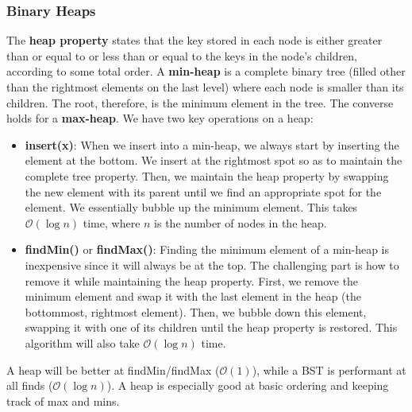 \documentclass{article}
\newcommand{\bigO}{\mathcal{O}}
\begin{document}
    \subsubsection{Binary Heaps}
    The \textbf{heap property} states that the key stored in each node is either greater than or equal to or less than or equal to the keys in the node's children, according to some total order. A \textbf{min-heap} is a complete binary tree (filled other than the rightmost elements on the last level) where each node is smaller than its children. The root, therefore, is the minimum element in the tree. The converse holds for a \textbf{max-heap}. We have two key operations on a heap: 
    
    \begin{itemize}
        \item \textbf{insert(x)}: When we insert into a min-heap, we always start by inserting the element at the bottom. We insert at the rightmost spot so as to maintain the complete tree property. Then, we maintain the heap property by swapping the new element with its parent until we find an appropriate spot for the element. We essentially bubble up the minimum element. This takes $\bigO (\log n)$ time, where $n$ is the number of nodes in the heap. 
        
        \item \textbf{findMin()} or \textbf{findMax()}: Finding the minimum element of a min-heap is inexpensive since it will always be at the top. The challenging part is how to remove it while maintaining the heap property. First, we remove the minimum element and swap it with the last element in the heap (the bottommost, rightmost element). Then, we bubble down this element, swapping it with one of its children until the heap property is restored. This algorithm will also take $\bigO( \log n)$ time. 
    \end{itemize}
    
    A heap will be better at findMin/findMax ($\bigO(1)$), while a BST is performant at all finds ($\bigO(\log n)$). A heap is especially good at basic ordering and keeping track of max and mins.
\end{document}
